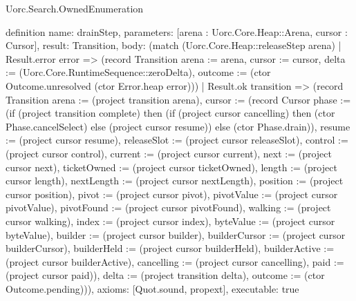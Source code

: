 \begin{lexlean}{Uorc.Search.OwnedEnumeration}
\begin{semanticmodule}
definition{
  name: drainStep,
  parameters: [arena : Uorc.Core.Heap::Arena, cursor : Cursor],
  result: Transition,
  body: (match (Uorc.Core.Heap::releaseStep arena)
    | Result.error error => (record Transition {arena := arena, cursor := cursor, delta := (Uorc.Core.RuntimeSequence::zeroDelta), outcome := (ctor Outcome.unresolved (ctor Error.heap error))})
    | Result.ok transition => (record Transition {arena := (project transition arena), cursor := (record Cursor {phase := (if (project transition complete) then (if (project cursor cancelling) then (ctor Phase.cancelSelect) else (project cursor resume)) else (ctor Phase.drain)), resume := (project cursor resume), releaseSlot := (project cursor releaseSlot), control := (project cursor control), current := (project cursor current), next := (project cursor next), ticketOwned := (project cursor ticketOwned), length := (project cursor length), nextLength := (project cursor nextLength), position := (project cursor position), pivot := (project cursor pivot), pivotValue := (project cursor pivotValue), pivotFound := (project cursor pivotFound), walking := (project cursor walking), index := (project cursor index), byteValue := (project cursor byteValue), builder := (project cursor builder), builderCursor := (project cursor builderCursor), builderHeld := (project cursor builderHeld), builderActive := (project cursor builderActive), cancelling := (project cursor cancelling), paid := (project cursor paid)}), delta := (project transition delta), outcome := (ctor Outcome.pending)})),
  axioms: [Quot.sound, propext],
  executable: true
}


\end{semanticmodule}
\end{lexlean}
